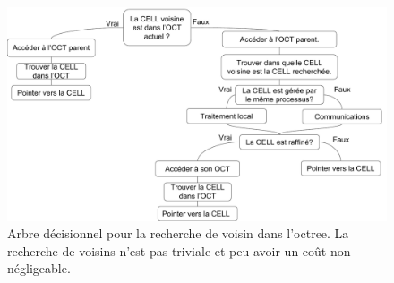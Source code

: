 \begin{figure}
        \includegraphics[width=\linewidth]{img/02/voisins.pdf} 
        \caption[Recherche de voisin dans l'octree.]{Arbre décisionnel pour la recherche de voisin dans l'octree.
        La recherche de voisins n'est pas triviale et peu avoir un coût non négligeable.
     	\label{fig:voisin} }
\end{figure}

%
%
